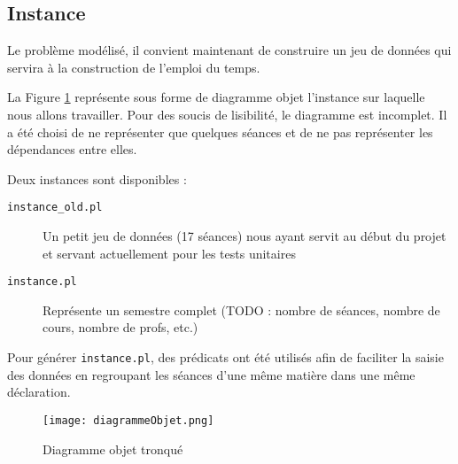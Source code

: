 \subsection{Instance}

Le problème modélisé, il convient maintenant de construire un jeu de données qui
servira à la construction de l'emploi du temps.

La Figure \ref{fig:objet} représente sous forme de diagramme objet l'instance
sur laquelle nous allons travailler. Pour des soucis de lisibilité, le diagramme
est incomplet. Il a été choisi de ne représenter que quelques séances et de ne
pas représenter les dépendances entre elles.

Deux instances sont disponibles :

\begin{description}

    \item[\texttt{instance\_old.pl}] Un petit jeu de données (17 séances) nous
        ayant servit au début du projet et servant actuellement pour les tests
        unitaires

    \item[\texttt{instance.pl}] Représente un semestre complet (TODO : nombre de
        séances, nombre de cours, nombre de profs, etc.)

\end{description}

Pour générer \texttt{instance.pl}, des prédicats ont été utilisés afin de
faciliter la saisie des données en regroupant les séances d'une même matière
dans une même déclaration.

\begin{landscape}

    \begin{figure}[t]
        \texttt{[image: diagrammeObjet.png]}
            \caption{\label{fig:objet} Diagramme objet tronqué}
    \end{figure}

\end{landscape}

